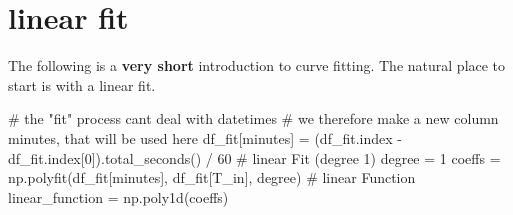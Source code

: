 \documentclass[
  letterpaper,
  DIV=11,
  numbers=noendperiod,
  oneside]{scrreprt}
\newenvironment{Shaded}{\begin{snugshade}}{\end{snugshade}}
\newcommand{\CommentTok}[1]{\textcolor[rgb]{0.37,0.37,0.37}{#1}}
\newcommand{\DecValTok}[1]{\textcolor[rgb]{0.68,0.00,0.00}{#1}}
\newcommand{\NormalTok}[1]{\textcolor[rgb]{0.00,0.23,0.31}{#1}}
\newcommand{\OperatorTok}[1]{\textcolor[rgb]{0.37,0.37,0.37}{#1}}
\newcommand{\StringTok}[1]{\textcolor[rgb]{0.13,0.47,0.30}{#1}}
\begin{document}
\hypertarget{linear-fit}{%
\section{linear fit}\label{linear-fit}}

The following is a \textbf{very short} introduction to curve fitting.
The natural place to start is with a linear fit.

\begin{Shaded}
\begin{Highlighting}[]
\CommentTok{\# the "fit" process can\textquotesingle{}t deal with datetimes}
\CommentTok{\# we therefore make a new column \textquotesingle{}minutes\textquotesingle{}, that will be used here}
\NormalTok{df\_fit[}\StringTok{\textquotesingle{}minutes\textquotesingle{}}\NormalTok{] }\OperatorTok{=}\NormalTok{ (df\_fit.index }\OperatorTok{{-}}\NormalTok{ df\_fit.index[}\DecValTok{0}\NormalTok{]).total\_seconds() }\OperatorTok{/} \DecValTok{60}
\CommentTok{\# linear Fit (degree 1)}
\NormalTok{degree }\OperatorTok{=} \DecValTok{1}
\NormalTok{coeffs }\OperatorTok{=}\NormalTok{ np.polyfit(df\_fit[}\StringTok{\textquotesingle{}minutes\textquotesingle{}}\NormalTok{], df\_fit[}\StringTok{\textquotesingle{}T\_in\textquotesingle{}}\NormalTok{], degree)}
\CommentTok{\# linear Function}
\NormalTok{linear\_function }\OperatorTok{=}\NormalTok{ np.poly1d(coeffs)}
\end{Highlighting}
\end{Shaded}
\end{document}
